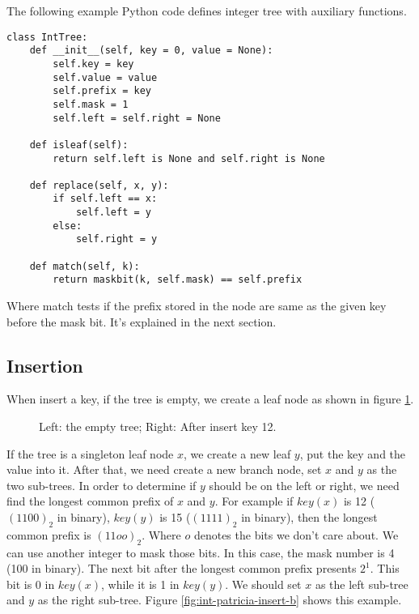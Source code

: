 \documentclass{article}
\begin{document}
The following example Python code defines integer tree with auxiliary functions.

\lstset{language=Python}
\begin{lstlisting}
class IntTree:
    def __init__(self, key = 0, value = None):
        self.key = key
        self.value = value
        self.prefix = key
        self.mask = 1
        self.left = self.right = None

    def isleaf(self):
        return self.left is None and self.right is None

    def replace(self, x, y):
        if self.left == x:
            self.left = y
        else:
            self.right = y

    def match(self, k):
        return maskbit(k, self.mask) == self.prefix
\end{lstlisting}

Where match tests if the prefix stored in the node are same as the given key
before the mask bit. It's explained in the next section.

\subsection{Insertion}
When insert a key, if the tree is empty, we create a leaf node as shown in figure
\ref{fig:int-patricia-insert-a}.

\begin{figure}[htbp]
  \centering
  \caption{Left: the empty tree; Right: After insert key 12.}
  \label{fig:int-patricia-insert-a}
\end{figure}

If the tree is a singleton leaf node $x$, we create a new leaf $y$,
put the key and the value into it. After that, we need create a new branch
node, set $x$ and $y$ as the two sub-trees.
In order to determine if $y$ should be on the left or right, we need
find the longest common prefix of $x$ and $y$. For example if $key(x)$
is 12 ($(1100)_2$ in binary), $key(y)$ is 15 ($(1111)_2$ in binary), then the longest
common prefix is $(11oo)_2$. Where $o$ denotes the bits we don't care about.
We can use another integer to mask those bits.
In this case, the mask number is 4 (100 in binary).
The next bit after the longest common prefix presents $2^1$. This bit is
0 in $key(x)$, while it is 1 in $key(y)$. We should set $x$ as the left
sub-tree and $y$ as the right sub-tree. Figure \ref{fig:int-patricia-insert-b}
shows this example.
\end{document}
